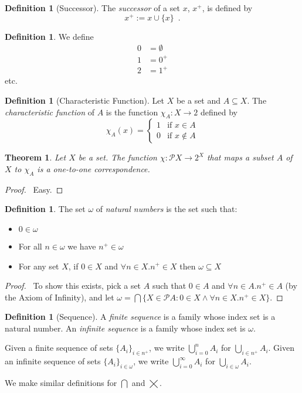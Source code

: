 \documentclass{report}
\let\qed\relax
\newtheorem{thm}[ax]{Theorem}
\theoremstyle{definition}
\newtheorem{df}[ax]{Definition}
\begin{document}
\begin{df}[Successor]
The \emph{successor} of a set $x$, $x^+$, is defined by
\[ x^+ := x \cup \{x\} \enspace . \]
\end{df}

\begin{df}
We define
\begin{align*}
0 & = \emptyset \\
1 & = 0^+ \\
2 & = 1^+
\end{align*}
etc.
\end{df}

\begin{df}[Characteristic Function]
Let $X$ be a set and $A \subseteq X$. The \emph{characteristic function} of $A$ is the function $\chi_A : X \rightarrow 2$ defined by
\[ \chi_A(x) = \begin{cases}
1 & \text{if } x \in A \\
0 & \text{if } x \notin A
\end{cases} \]
\end{df}

\begin{thm}
Let $X$ be a set. The function $\chi : \mathcal{P} X \rightarrow 2^X$ that maps a subset $A$ of $X$ to $\chi_A$ is a one-to-one correspondence.
\end{thm}

\begin{proof}
\pf\ Easy. \qed
\end{proof}

\begin{df}
The set $\omega$ of \emph{natural numbers} is the set such that:
\begin{itemize}
\item $0 \in \omega$
\item For all $n \in \omega$ we have $n^+ \in \omega$
\item For any set $X$, if $0 \in X$ and $\forall n \in X. n^+ \in X$ then $\omega \subseteq X$
\end{itemize}
\end{df}

\begin{proof}
\pf\ To show this exists, pick a set $A$ such that $0 \in A$ and $\forall n \in A. n^+ \in A$ (by the Axiom of Infinity), and let $\omega = \bigcap \{ X \in \mathcal{P} A : 0 \in X \wedge \forall n \in X. n^+ \in X \}$. \qed
\end{proof}

\begin{df}[Sequence]
A \emph{finite sequence} is a family whose index set is a natural number. An \emph{infinite sequence} is a family whose index set is $\omega$.

Given a finite sequence of sets $\{ A_i \}_{i \in n^+}$, we write $\bigcup_{i=0}^n A_i$ for $\bigcup_{i \in n^+} A_i$. Given an infinite sequence of sets $\{ A_i \}_{i \in \omega}$, we write $\bigcup_{i=0}^\infty A_i$ for $\bigcup_{i \in \omega} A_i$.

We make similar definitions for $\bigcap$ and $\bigtimes$.
\end{df}
\end{document}

